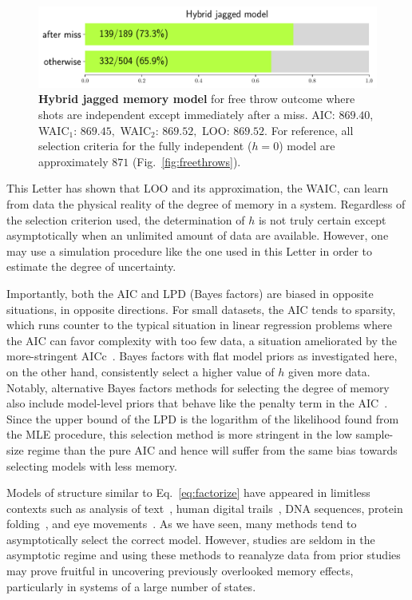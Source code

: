 \documentclass[prl,twocolumn,groupedaddress]{revtex4-1}
\begin{document}
\begin{figure}
\includegraphics[width=\linewidth]{fig5}

\caption{\textbf{Hybrid jagged memory model} for free throw outcome where shots are independent except immediately after a miss. AIC: $869.40$, WAIC$_1$: $869.45,$ WAIC$_2$: $869.52,$ LOO: $869.52.$ For reference, all selection criteria for the fully independent ($h=0$) model are approximately $871$ (Fig.~\ref{fig:freethrows}).} 
\label{fig:fig5}
\end{figure}

This Letter has shown that LOO and its approximation, the WAIC, can learn from data the physical reality of the 
degree of memory in a system. Regardless of the selection criterion used, the determination of $h$ is not truly certain except asymptotically when an unlimited amount of data are available. However, one may use a simulation procedure like the one used in this Letter in order to estimate the degree of uncertainty.  

Importantly,   both the AIC and LPD (Bayes factors) are biased in opposite situations, in opposite directions. For small datasets, the AIC tends to sparsity, which runs counter to the typical situation in linear regression problems where the AIC can favor complexity with too few data, a situation ameliorated by the more-stringent AICc~\cite{claeskens2008model}. Bayes factors with flat model  priors as investigated here, on the other hand, consistently select a higher value of $h$ given more data.
%
Notably, alternative Bayes factors methods for selecting the degree of memory also include model-level priors that behave like the penalty term in the AIC~\cite{strelioff2007inferring,singer2014detecting}. Since the upper bound of the LPD is the logarithm of the likelihood found from the MLE procedure, this selection method is more stringent in the low sample-size regime than the pure AIC and hence will suffer from the same bias towards selecting models with less memory.


Models of structure similar to Eq.~\ref{eq:factorize} have appeared in limitless contexts such as analysis of text~\cite{melnyk2006memory}, human digital trails~\cite{singer2014detecting}, DNA sequences, protein folding~\cite{yuan1999prediction}, and eye movements~\cite{bettenbuhl2012bayesian}. As we have seen, many methods tend to asymptotically select the correct model. However, studies are seldom in the asymptotic regime and using these methods  to reanalyze data from prior studies may prove fruitful in uncovering previously overlooked memory effects, particularly in systems of a large number of states. 
\end{document}
